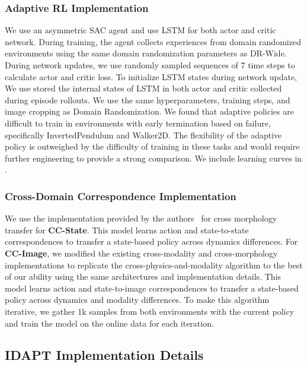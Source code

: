\subsubsection{\textbf{Adaptive RL Implementation}}
We use an asymmetric SAC agent and use LSTM for both actor and critic network. During training, the agent collects experiences from domain randomized environments using the same domain randomization parameters as DR-Wide. During network updates, we use randomly sampled sequences of 7 time steps to calculate actor and critic loss. To initialize LSTM states during network update, We use stored the internal states of LSTM in both actor and critic collected during episode rollouts. We use the same hyperparameters, training steps, and image cropping as Domain Randomization.  We found that adaptive policies are difficult to train in environments with early termination based on failure, specifically InvertedPendulum and Walker2D.  The flexibility of the adaptive policy is outweighed by the difficulty of training in these tasks and would require further engineering to provide a strong comparison.  We include learning curves in .


\subsubsection{\textbf{Cross-Domain Correspondence Implementation}}
\label{sec:cc_implementation}
We use the implementation provided by the authors~\citep{zhang2021learning} for cross morphology transfer for \textbf{CC-State}.  This model learns action and state-to-state correspondences to transfer a state-based policy across dynamics differences.  For \textbf{CC-Image}, we modified the existing cross-modality and cross-morphology implementations to replicate the cross-physics-and-modality algorithm to the best of our ability using the same architectures and implementation details.  This model learns action and state-to-image correspondences to transfer a state-based policy across dynamics and modality differences.  To make this algorithm iterative, we gather 1k samples from both environments with the current policy and train the model on the online data for each iteration.



\subsection{IDAPT Implementation Details}
\label{sec:idapt_details}

